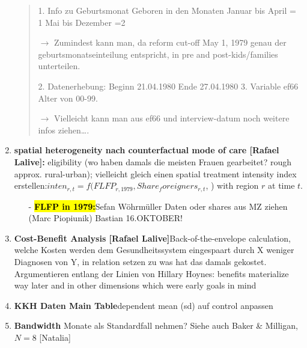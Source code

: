 \documentclass[11pt,a4paper]{article}
\begin{document}
\begin{enumerate}
\begin{quote}
1.	Info zu Geburtsmonat   Geboren in den Monaten
Januar bis April = 1
Mai bis Dezember  =2 

$\rightarrow$	Zumindest kann man, da reform cut-off May 1, 1979 genau der geburtsmonatseinteilung entspricht, in pre and post-kids/families unterteilen.

2.	Datenerhebung: 
Beginn 21.04.1980 
Ende 27.04.1980 
3. Variable ef66 Alter von 00-99.

$\rightarrow$	Vielleicht kann man aus ef66 und interview-datum noch weitere infos ziehen….
\end{quote}


\item  \textbf{spatial heterogeneity nach counterfactual mode of care [Rafael Lalive]:} \newline eligibility (wo haben damals die meisten Frauen gearbeitet? rough approx. rural-urban); vielleicht gleich einen spatial treatment intensity index erstellen:\newline $inten_{r,t}=f(FLFP_{r,1979}, Share_foreigners_{r,t}$, ) \newline
with region $r$ at time $t$. 
\begin{itemize}
\item[-] \textbf{\hl{FLFP in 1979:}}\newline Sefan Wöhrmüller Daten oder shares aus MZ ziehen (Marc Piopiunik) Bastian 16.OKTOBER!
\end{itemize}


\item \textbf{Cost-Benefit Analysis [Rafael Lalive]}\newline Back-of-the-envelope calculation, welche Kosten werden dem Gesundheitssystem eingespaart durch X weniger Diagnosen von Y, in relation setzen zu was hat das damals gekostet. Argumentieren entlang der Linien von Hillary Hoynes: benefits materialize way later and in other dimensions which were early goals in mind

\item \textbf{KKH Daten Main Table}\newline dependent mean (sd) auf control anpassen

\item \textbf{Bandwidth} Monate als Standardfall nehmen? \newline
Siehe auch Baker \& Milligan, $N=8$ [Natalia]


\end{enumerate}
\end{document}
